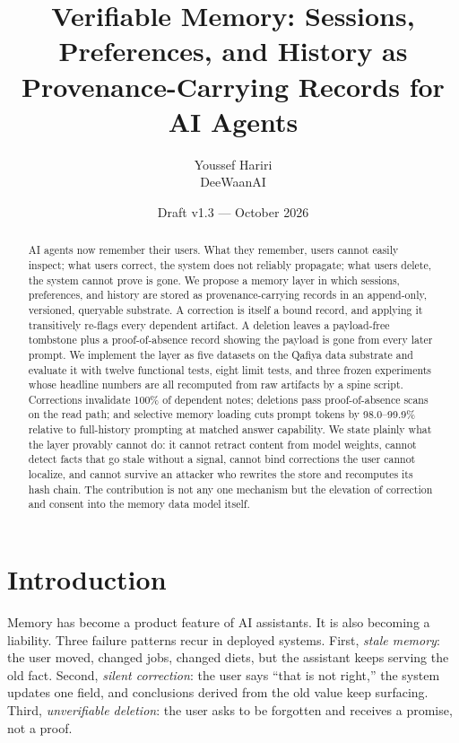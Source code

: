 \documentclass[11pt]{article}
\title{\textbf{Verifiable Memory: Sessions, Preferences, and History as\\ Provenance-Carrying Records for AI Agents}}
\author{Youssef Hariri\\ DeeWaanAI}
\date{Draft v1.3 --- October 2026}
\begin{document}
\maketitle

\begin{abstract}
\noindent AI agents now remember their users. What they remember, users cannot easily inspect; what users correct, the system does not reliably propagate; what users delete, the system cannot prove is gone. We propose a memory layer in which sessions, preferences, and history are stored as provenance-carrying records in an append-only, versioned, queryable substrate. A correction is itself a bound record, and applying it transitively re-flags every dependent artifact. A deletion leaves a payload-free tombstone plus a proof-of-absence record showing the payload is gone from every later prompt. We implement the layer as five datasets on the Qafiya data substrate and evaluate it with twelve functional tests, eight limit tests, and three frozen experiments whose headline numbers are all recomputed from raw artifacts by a spine script. Corrections invalidate 100\% of dependent notes; deletions pass proof-of-absence scans on the read path; and selective memory loading cuts prompt tokens by 98.0--99.9\% relative to full-history prompting at matched answer capability. We state plainly what the layer provably cannot do: it cannot retract content from model weights, cannot detect facts that go stale without a signal, cannot bind corrections the user cannot localize, and cannot survive an attacker who rewrites the store and recomputes its hash chain. The contribution is not any one mechanism but the elevation of correction and consent into the memory data model itself.
\end{abstract}

\section{Introduction}
Memory has become a product feature of AI assistants. It is also becoming a liability. Three failure patterns recur in deployed systems. First, \emph{stale memory}: the user moved, changed jobs, changed diets, but the assistant keeps serving the old fact. Second, \emph{silent correction}: the user says ``that is not right,'' the system updates one field, and conclusions derived from the old value keep surfacing. Third, \emph{unverifiable deletion}: the user asks to be forgotten and receives a promise, not a proof.
\end{document}
